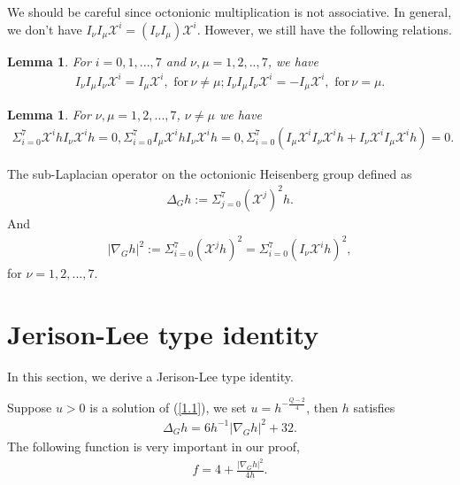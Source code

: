 \documentclass[reqno,12pt]{amsart}
\numberwithin{equation}{section}
\theoremstyle{plain}
\newtheorem{lemma}[theorem]{Lemma}
\theoremstyle{definition}
\begin{document}
We should be careful since octonionic multiplication is not associative. In general, we don't have $I_\nu I_\mu\mathscr{X}^i=(I_\nu I_\mu)\mathscr{X}^i$. However, we still have the following relations.
\begin{lemma}\label{lemma2.2}
For $i=0,1,...,7$ and $\nu,\mu=1,2,..,7$, we have
    \begin{equation*}
        \begin{aligned}
            I_\nu I_\mu I_\nu \mathscr{X}^i=I_\mu \mathscr{X}^i,\,\,\textrm{for}\,\nu\neq \mu;I_\nu I_\mu I_\nu \mathscr{X}^i=-I_\mu \mathscr{X}^i,\,\,\textrm{for}\,\nu= \mu.        \end{aligned}
    \end{equation*}
\end{lemma}
\begin{lemma}\label{lemma2.3}
    For $\nu,\mu=1,2,...,7$, $\nu\neq \mu$ we have
    \begin{align*}
        \Sigma_{i=0}^7\mathscr{X}^i h I_\nu\mathscr{X}^i h=0,\Sigma_{i=0}^7 I_\mu \mathscr{X}^ih I_\nu\mathscr{X}^i h=0,\Sigma_{i=0}^7 (I_\mu \mathscr{X}^i I_\nu\mathscr{X}^i h+I_\nu\mathscr{X}^iI_\mu\mathscr{X}^ih)=0.    \end{align*}
\end{lemma}


The sub-Laplacian operator on the octonionic Heisenberg group defined as
\begin{align*}
    \Delta_G h:=\Sigma_{j=0}^7(\mathscr{X}^j)^2h.
\end{align*}
And 
\begin{align*}
    |\nabla_G h|^2:=\Sigma_{i=0}^7(\mathscr{X}^j h)^2=\Sigma_{i=0}^7(I_\nu\mathscr{X}^i h)^2,
    \end{align*}
for $\nu=1,2,...,7.$



    
\section{Jerison-Lee type identity }\label{s3} 
In this section, we derive a Jerison-Lee type identity.


Suppose $u>0$ is a solution of (\ref{1.1}), we set  $u=h^{-\frac{Q-2}{4}}$, then $h$ satisfies
\begin{align}\label{3.1}
    \Delta_G h=6h^{-1}|\nabla_G h|^2+32.
\end{align}
The following function is very important in our proof,
\begin{align}\label{3.2}
    f=4+\frac{|\nabla_G h|^2}{4h}.
    \end{align}
\end{document}
